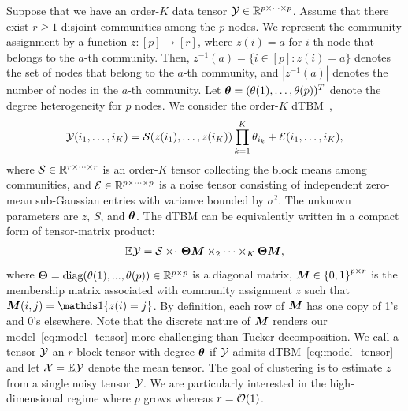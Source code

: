 \documentclass[journal]{IEEEtran}
\theoremstyle{definition}
\theoremstyle{definition}
\newcommand{\offf}[1]{\left\{#1\right\}}
\begin{document}
Suppose that we have an order-$K$ data tensor $\mathcal{Y} \in \mathbb{R}^{p \times \cdots \times p}$. %
Assume that there exist $r \geq 1$  disjoint communities among the $p$ nodes. We represent the community assignment by a function $z \colon [p]\mapsto[r]$, where $z(i) = a$ for $i$-th node that belongs to the $a$-th community. Then, $z^{-1}(a)=\{i\in[p]\colon z(i)=a\}$ denotes the set of nodes that belong to the $a$-th community, and $|z^{-1}(a)|$ denotes the number of nodes in the $a$-th community. Let $\boldsymbol{\theta}=(\theta(1),\ldots,\theta(p))^T$ denote the degree heterogeneity for $p$ nodes. We consider the order-$K$ dTBM~\citep{ghoshdastidar2017consistency,ke2019community},
\begin{equation}\label{eq:model_margin}
    \tY(i_1,\ldots,i_K) = \tS(z(i_1),\ldots,z(i_K)) \prod_{k = 1}^K\theta_{i_k} + \tE(i_1,\ldots,i_K), 
\end{equation}
\normalsize
where $\mathcal{S} \in \mathbb{R}^{r \times \cdots \times r}$ is an order-$K$ tensor collecting the block means among communities, and %
$\mathcal{E}\in\mathbb{R}^{p\times \cdots \times p}$ is a noise tensor consisting of independent zero-mean sub-Gaussian entries with variance bounded by $\sigma^2$. 
The unknown parameters are $z$, $S$, and $\boldsymbol{\theta}$. The dTBM can be equivalently written in a compact form of tensor-matrix product:
\begin{equation}\label{eq:model_tensor}
\bbE\tY = \tS \times_1 \mTheta \mM \times_2 \cdots \times_K  \mTheta \mM,
\end{equation}
where $\boldsymbol{\Theta} = \text{diag}(\theta(1),...,\theta(p)) \in \mathbb{R}^{p \times p}$ is a diagonal matrix, $\mM \in \offf{0,1}^{p \times r}$ is the membership matrix associated with community assignment $z$ such that $\mM(i,j)=\ind\{z(i)=j\}$. By definition, each row of $\bm M$ has one copy of 1's and 0's elsewhere. Note that the discrete nature of $\bm M$ renders our model~\eqref{eq:model_tensor} more challenging than Tucker decomposition. We call a tensor $\mathcal{Y}$ an $r$-block tensor with degree $\boldsymbol{\theta}$ if $\mathcal{Y}$ admits dTBM~\eqref{eq:model_tensor}   {and let $\mathcal{X} = \mathbb{E} \mathcal{Y}$ denote the mean tensor.} The goal of clustering is to estimate $z$ from a single noisy tensor $\mathcal{Y}$. We are particularly interested in the high-dimensional regime where $p$ grows whereas $r=\mathcal{O}(1)$. 
\end{document}

